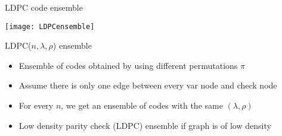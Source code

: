 \begin{frame}{LDPC code ensemble}
\begin{center}
\texttt{[image: LDPCensemble]}
\end{center}
\vspace*{-3mm}
\begin{block}{LDPC($n,\lambda,\rho$) ensemble}
\begin{itemize}
\item Ensemble of codes obtained by using different permutations $\pi$
\item Assume there is only one edge between every var node and check node
\item For every $n$, we get an ensemble of codes with the same $(\lambda,\rho)$
\item \alert{Low density parity check} (LDPC) ensemble if graph is of low density
\end{itemize}
\end{block}
\end{frame}
